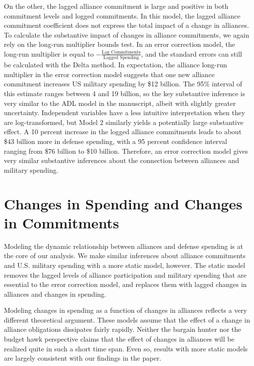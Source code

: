 \documentclass[12pt]{article}
\begin{document}
On the other, the lagged alliance commitment is large and positive in both commitment levels and logged commitments. 
In this model, the lagged alliance commitment coefficient does not express the total impact of a change in alliances. 
To calculate the substantive impact of changes in alliance commitments, we again rely on the long-run multiplier bounds test. 
In an error correction model, the long-run multiplier is equal to $-\frac{\mbox{Lag Commitments}}{\mbox{Lagged Spending}}$, and the standard errors can still be calculated with the Delta method. 
In expectation, the alliance long-run multiplier in the error correction model suggests that one new alliance commitment increases US military spending by \$12 billion. 
The 95\% interval of this estimate ranges between 4 and 19 billion, so the key substantive inference is very similar to the ADL model in the manuscript, albeit with slightly greater uncertainty. 
Independent variables have a less intuitive interpretation when they are log-transformed, but Model 2 similarly yields a potentially large substantive effect.  
A 10 percent increase in the logged alliance commitments leads to about \$43 billion more in defense spending, with a 95 percent confidence interval ranging from \$76 billion to \$10 billion.
Therefore, an error correction model gives very similar substantive inferences about the connection between alliances and military spending. 



\section{Changes in Spending and Changes in Commitments} 


Modeling the dynamic relationship between alliances and defense spending is at the core of our analysis. 
We make similar inferences about alliance commitments and U.S. military spending with a more static model, however. 
The static model removes the lagged levels of alliance participation and military spending that are essential to the error correction model, and replaces them with lagged changes in alliances and changes in spending. 


Modeling changes in spending as a function of changes in alliances reflects a very different theoretical argument.
These models assume that the effect of a change in alliance obligations dissipates fairly rapidly. 
Neither the bargain hunter nor the budget hawk perspective claims that the effect of changes in alliances will be realized quite in such a short time span.   
Even so, results with more static models are largely consistent with our findings in the paper. 
\end{document}
